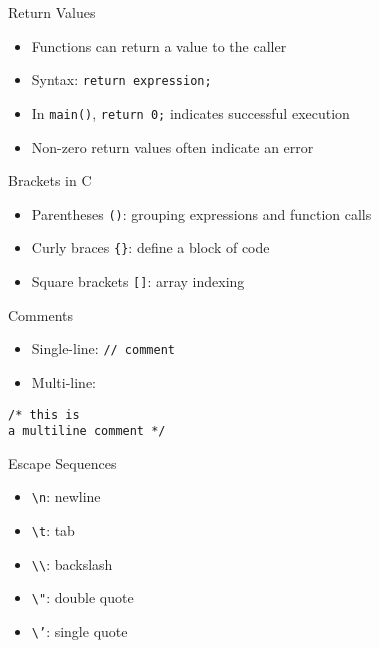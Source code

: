 \documentclass[12pt, aspectratio=169]{beamer}
\begin{document}
    \begin{frame}{Return Values}
        \begin{itemize}
            \item Functions can return a value to the caller
            \item Syntax: \texttt{return expression;}
            \item In \texttt{main()}, \texttt{return 0;} indicates successful execution
            \item Non-zero return values often indicate an error
        \end{itemize}
    \end{frame}


    \begin{frame}{Brackets in C}
        \begin{itemize}
            \item Parentheses \texttt{()}: grouping expressions and function calls
            \item Curly braces \texttt{\{\}}: define a block of code
            \item Square brackets \texttt{[]}: array indexing
        \end{itemize}
    \end{frame}


    \begin{frame}[fragile]{Comments}
        \begin{itemize}
            \item Single-line: \texttt{// comment}
            \item Multi-line:
        \end{itemize}
        \begin{verbatim}
/* this is
a multiline comment */
        \end{verbatim}
    \end{frame}


    \begin{frame}{Escape Sequences}
        \begin{itemize}
            \item \texttt{\textbackslash n}: newline
            \item \texttt{\textbackslash t}: tab
            \item \texttt{\textbackslash\textbackslash}: backslash
            \item \texttt{\textbackslash"}: double quote
            \item \texttt{\textbackslash'}: single quote
        \end{itemize}
    \end{frame}
\end{document}
